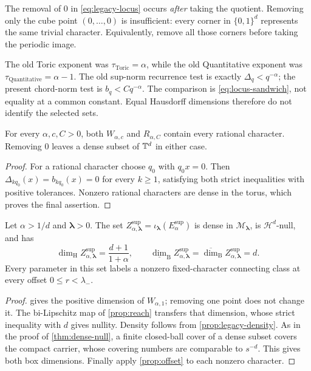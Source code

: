 \documentclass[11pt,a4paper]{article}
\begin{document}
The removal of $0$ in \cref{eq:legacy-locus} occurs \emph{after} taking
the quotient.  Removing only the cube point $(0,\ldots,0)$ is insufficient:
every corner in $\{0,1\}^d$ represents the same trivial character.
Equivalently, remove all those corners before taking the periodic image.

The old Toric exponent was $\tau_{\mathrm{Toric}}=\alpha$, while the
old Quantitative exponent was $\tau_{\mathrm{Quantitative}}=\alpha-1$.
The old sup-norm recurrence test is exactly $\Delta_q<q^{-\alpha}$;
the present chord-norm test is $b_q<Cq^{-\alpha}$.  The comparison is
\cref{eq:locus-sandwich}, not equality at a common constant.  Equal
Hausdorff dimensions therefore do not identify the selected sets.

\begin{proposition}
\label{prop:legacy-density}
For every $\alpha,c,C>0$, both $W_{\alpha,c}$ and $R_{\alpha,C}$
contain every rational character.  Removing $0$ leaves a dense subset
of $\mathbb T^d$ in either case.
\end{proposition}

\begin{proof}
For a rational character choose $q_0$ with $q_0x=0$.  Then
$\Delta_{kq_0}(x)=b_{kq_0}(x)=0$ for every $k\geq1$, satisfying both
strict inequalities with positive tolerances.  Nonzero rational
characters are dense in the torus, which proves the final assertion.
\end{proof}

\begin{corollary}
\label{cor:legacy-carrier}
Let $\alpha>1/d$ and $\boldsymbol\lambda>0$.  The set
$Z^{\mathrm{sup}}_{\alpha,\boldsymbol\lambda}
 =\iota_{\boldsymbol\lambda}(E^{\mathrm{sup}}_\alpha)$ is dense in
$\mathcal M_{\boldsymbol\lambda}$, is $\mathcal H^d$-null, and has
\[
 \dim_{\mathrm H}Z^{\mathrm{sup}}_{\alpha,\boldsymbol\lambda}
   =\frac{d+1}{1+\alpha},\qquad
 \underline{\dim}_{\mathrm B}Z^{\mathrm{sup}}_{\alpha,\boldsymbol\lambda}
 =\overline{\dim}_{\mathrm B}Z^{\mathrm{sup}}_{\alpha,\boldsymbol\lambda}=d.
\]
Every parameter in this set labels a nonzero fixed-character connecting
class at every offset $0\leq r<\lambda_-$.
\end{corollary}

\begin{proof}
 gives the positive dimension of $W_{\alpha,1}$;
removing one point does not change it.  The bi-Lipschitz map of
\cref{prop:reach} transfers that dimension, whose strict inequality with
$d$ gives nullity.  Density follows from \cref{prop:legacy-density}.
As in the proof of \cref{thm:dense-null}, a finite closed-ball cover of
a dense subset covers the compact carrier, whose covering numbers are
comparable to $s^{-d}$.  This gives both box dimensions.  Finally apply
\cref{prop:offset} to each nonzero character.
\end{proof}
\end{document}
